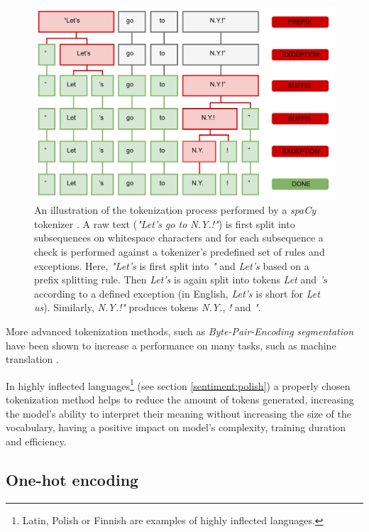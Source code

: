 \begin{figure}[]
\centering
\includegraphics[scale=0.5]{figures/tokenization.png}
\caption{An illustration of the tokenization process performed by a \emph{spaCy} tokenizer \cite{spacy:101}. A raw text (\textit{"Let's go to N.Y.!"})  is first split into subsequences on whitespace characters and for each subsequence a check is performed against a tokenizer's predefined set of rules and exceptions. Here, \textit{"Let's} is first split into \textit{"} and \textit{Let's} based on a prefix splitting rule. Then \textit{Let's} is again split into tokens \textit{Let} and \textit{'s} according to a defined exception (in English, \textit{Let's} is short for \textit{Let us}). Similarly, \textit{N.Y.!"} produces tokens \textit{N.Y.}, \textit{!} and \textit{"}. }
\label{tokenization:1}
\end{figure}

More advanced tokenization methods, such as \emph{Byte-Pair-Encoding segmentation} have been shown to increase a performance on many tasks, such as machine translation \cite{kudo:subword}. 

In highly inflected languages\footnote{Latin, Polish or Finnish are examples of highly inflected languages.} (see section \ref{sentiment:polish}) a properly chosen tokenization method helps to reduce the amount of tokens generated, increasing the model's ability to interpret their meaning without increasing the size of the vocabulary, having a positive impact on model's complexity, training duration and efficiency.

\subsection{One-hot encoding}

